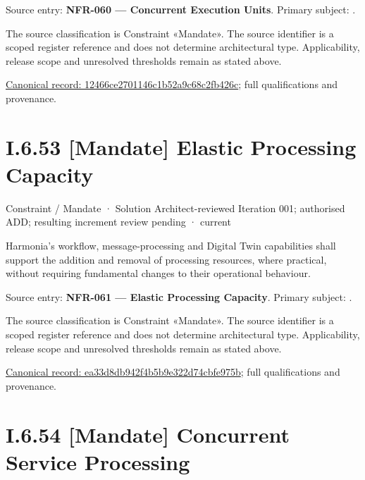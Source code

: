 Source entry: \textbf{NFR-060 — Concurrent Execution Units}. Primary subject: \texttt{}.



The source classification is Constraint «Mandate». The source identifier is a scoped register reference and does not determine architectural type. Applicability, release scope and unresolved thresholds remain as stated above.


{\footnotesize \href{../../../../../../../../continuum/motivation/constraint/mandate/12466ce2701146c1b52a9c68c2fb426c.md}{Canonical record: 12466ce2701146c1b52a9c68c2fb426c}; full qualifications and provenance.}\par
\section*{I.6.53 [Mandate] Elastic Processing Capacity}
\label{navigation:I.6.53}

\label{element:ea33d8db942f4b5b9e322d74cbfe975b}
{\small Constraint / Mandate · Solution Architect-reviewed Iteration 001; authorised ADD; resulting increment review pending · current}\par

Harmonia's workflow, message-processing and Digital Twin capabilities shall support the addition and removal of processing resources, where practical, without requiring fundamental changes to their operational behaviour.



Source entry: \textbf{NFR-061 — Elastic Processing Capacity}. Primary subject: \texttt{}.



The source classification is Constraint «Mandate». The source identifier is a scoped register reference and does not determine architectural type. Applicability, release scope and unresolved thresholds remain as stated above.


{\footnotesize \href{../../../../../../../../continuum/motivation/constraint/mandate/ea33d8db942f4b5b9e322d74cbfe975b.md}{Canonical record: ea33d8db942f4b5b9e322d74cbfe975b}; full qualifications and provenance.}\par
\section*{I.6.54 [Mandate] Concurrent Service Processing}
\label{navigation:I.6.54}

